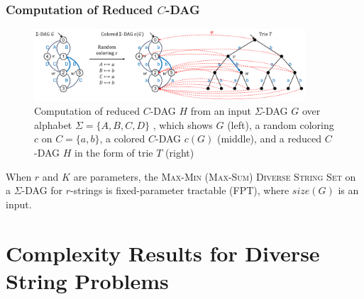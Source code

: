 \documentclass{beamer}
\begin{document}
\begin{frame}
    \frametitle{Computation of Reduced $C$-DAG}
    \begin{figure}[t]
        \baselineskip
        \centering
        \vspace{-0.5\baselineskip}
        \includegraphics[width=0.9\textwidth,angle=0]{./figfptalgo}
        \caption{Computation of reduced $C$-DAG $H$ from an input $\Sigma$-DAG $G$ over alphabet $\Sigma = \{A, B, C, D\}$ , which shows $G$  (left), a random coloring $c$ on $C = \{a,b\}$, a colored $C$-DAG $c(G)$ (middle), and a reduced $C$-DAG $H$ in the form of trie $T$ (right)}\label{fig:fptalgo}
    \end{figure}

    \begin{theorem}{}
        When $r$ and $K$ are parameters, the \textsc{Max-Min (Max-Sum) Diverse String Set}
        on a $\Sigma$-DAG for $r$-strings is fixed-parameter tractable (FPT), where $size(G)$ is
        an input.
    \end{theorem}

\end{frame}

\section{Complexity Results for Diverse String Problems}
\end{document}
